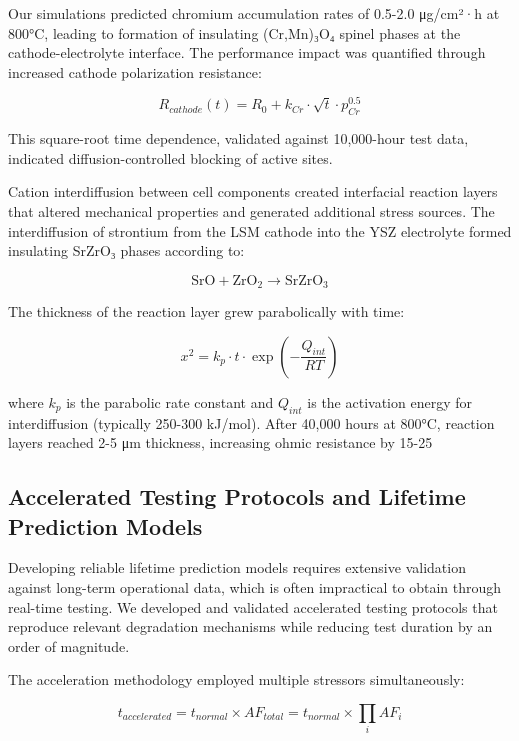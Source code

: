 \documentclass[conference]{IEEEtran}
\begin{document}
Our simulations predicted chromium accumulation rates of 0.5-2.0 μg/cm²·h at 800°C, leading to formation of insulating (Cr,Mn)₃O₄ spinel phases at the cathode-electrolyte interface. The performance impact was quantified through increased cathode polarization resistance:

\begin{equation}
R_{cathode}(t) = R_0 + k_{Cr} \cdot \sqrt{t} \cdot p_{Cr}^{0.5}
\end{equation}

This square-root time dependence, validated against 10,000-hour test data, indicated diffusion-controlled blocking of active sites.

Cation interdiffusion between cell components created interfacial reaction layers that altered mechanical properties and generated additional stress sources. The interdiffusion of strontium from the LSM cathode into the YSZ electrolyte formed insulating SrZrO₃ phases according to:

\begin{equation}
\text{SrO} + \text{ZrO}_2 \rightarrow \text{SrZrO}_3
\end{equation}

The thickness of the reaction layer grew parabolically with time:

\begin{equation}
x^2 = k_p \cdot t \cdot \exp\left(-\frac{Q_{int}}{RT}\right)
\end{equation}

where $k_p$ is the parabolic rate constant and $Q_{int}$ is the activation energy for interdiffusion (typically 250-300 kJ/mol). After 40,000 hours at 800°C, reaction layers reached 2-5 μm thickness, increasing ohmic resistance by 15-25%

\subsection{Accelerated Testing Protocols and Lifetime Prediction Models}

Developing reliable lifetime prediction models requires extensive validation against long-term operational data, which is often impractical to obtain through real-time testing. We developed and validated accelerated testing protocols that reproduce relevant degradation mechanisms while reducing test duration by an order of magnitude.

The acceleration methodology employed multiple stressors simultaneously:

\begin{equation}
t_{accelerated} = t_{normal} \times AF_{total} = t_{normal} \times \prod_i AF_i
\end{equation}
\end{document}

